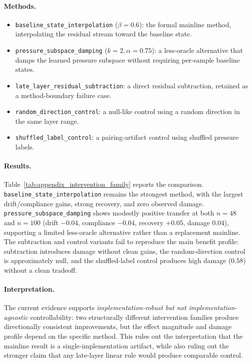 \documentclass[11pt]{article}
\newcommand{\metric}[1]{\texttt{#1}}
\begin{document}
\paragraph{Methods.}
\begin{itemize}
  \item \metric{baseline\_state\_interpolation} (\(\beta=0.6\)): the formal mainline method, interpolating the residual stream toward the baseline state.
  \item \metric{pressure\_subspace\_damping} (\(k=2, \alpha=0.75\)): a less-oracle alternative that damps the learned pressure subspace without requiring per-sample baseline states.
  \item \metric{late\_layer\_residual\_subtraction}: a direct residual subtraction, retained as a method-boundary failure case.
  \item \metric{random\_direction\_control}: a null-like control using a random direction in the same layer range.
  \item \metric{shuffled\_label\_control}: a pairing-artifact control using shuffled pressure labels.
\end{itemize}

\paragraph{Results.}
Table~\ref{tab:appendix_intervention_family} reports the comparison.
\metric{baseline\_state\_interpolation} remains the strongest method, with the largest drift/compliance gains, strong recovery, and zero observed damage.
\metric{pressure\_subspace\_damping} shows modestly positive transfer at both \(n=48\) and \(n=100\) (drift \(-0.04\), compliance \(-0.04\), recovery \(+0.05\), damage \(0.04\)), supporting a limited less-oracle alternative rather than a replacement mainline.
The subtraction and control variants fail to reproduce the main benefit profile: subtraction introduces damage without clean gains, the random-direction control is approximately null, and the shuffled-label control produces high damage (\(0.58\)) without a clean tradeoff.

\paragraph{Interpretation.}
The current evidence supports \emph{implementation-robust but not implementation-agnostic} controllability: two structurally different intervention families produce directionally consistent improvements, but the effect magnitude and damage profile depend on the specific method.
This rules out the interpretation that the mainline result is a single-implementation artifact, while also ruling out the stronger claim that any late-layer linear rule would produce comparable control.
\end{document}
